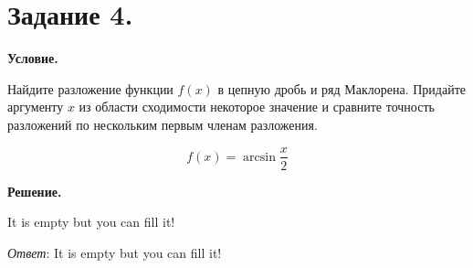 \section{Задание 4.}

\textbf{Условие.}

Найдите разложение функции $f(x)$ в цепную дробь и ряд Маклорена. Придайте аргументу $x$ из области 
сходимости некоторое значение и сравните точность разложений по нескольким первым членам разложения. 

\[f(x) = \arcsin \frac{x}{2}\]

\vspace{10mm}

\textbf{Решение.}

It is empty but you can fill it!

\textit{Ответ}:  It is empty but you can fill it!

\clearpage
